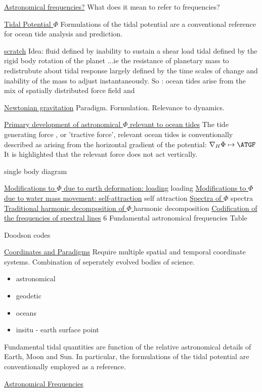 \underline{Astronomical frequencies?}
What does it mean to refer to frequencies?

\underline{Tidal Potential $\Phi$} 
Formulations of the tidal potential are a conventional reference for ocean tide analysis and prediction.

\underline{scratch} 
Idea:
fluid defined by inability to sustain a shear load
tidal defined by the rigid body rotation of the planet ...ie the resistance of planetary mass to redistrubute about 
tidal response largely defined by the time scales of change and inability of the mass to adjust instantaneously.
So : ocean tides arise from the mix of spatially distributed force field and 

\underline{Newtonian gravitation}
Paradigm.
Formulation.
Relevance to dynamics.

\underline{Primary development of astronomical $\Phi$ relevant to ocean tides}
The tide generating force \ATGF, or 'tractive force', relevant ocean tides is conventionally described as arising from the horizontal gradient of the potential: $\nabla_H\Phi \mapsto \ATGF$ \\
It is highlighted that the relevant force does not act vertically.  

single body diagram

\underline{Modifications to $\Phi$ due to earth deformation: loading}
loading
\underline{Modifications to $\Phi$ due to water mass movement: self-attraction}
self attraction
\underline{Spectra of $\Phi$}
spectra
\underline{Traditional harmonic decomposition of $\Phi$ }
harmonic decomposition
\underline{Codification of the frequencies of spectral lines}
6 Fundamental astronomical frequencies
Table

Doodson codes

\underline{Coordinates and Paradigms}  
Require multiple spatial and temporal coordinate systems.
Combination of seperately evolved bodies of science.
\begin{itemize}
\item astronomical 
\item geodetic
\item oceans
\item insitu - earth surface point
\end{itemize}
Fundamental tidal quantities are function of the relative astronomical details of Earth, Moon and Sun.  In particular, the formulations of the tidal potential are conventionally employed as a reference.

\underline{Astronomical Frequencies} 

